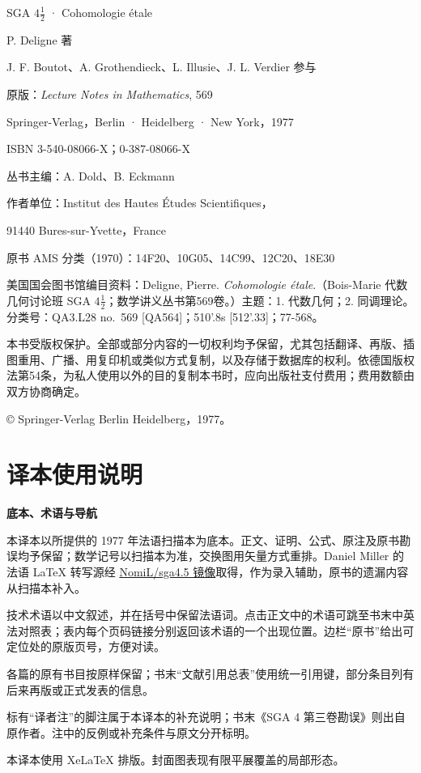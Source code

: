 {\large SGA $4\frac12$ · Cohomologie étale}\par
\vspace{10mm}
P. Deligne 著\par
J. F. Boutot、A. Grothendieck、L. Illusie、J. L. Verdier 参与\par
\vspace{10mm}
原版：\textit{Lecture Notes in Mathematics}, 569\par
Springer-Verlag，Berlin · Heidelberg · New York，1977\par
ISBN 3-540-08066-X；0-387-08066-X\par
丛书主编：A. Dold、B. Eckmann\par
作者单位：Institut des Hautes Études Scientifiques，\par
91440 Bures-sur-Yvette，France\par
原书 AMS 分类（1970）：14F20、10G05、14C99、12C20、18E30\par

\vspace{8mm}
{\footnotesize
美国国会图书馆编目资料：Deligne, Pierre. \textit{Cohomologie étale}.（Bois-Marie 代数几何讨论班 SGA $4\frac12$；数学讲义丛书第569卷。）主题：1. 代数几何；2. 同调理论。分类号：QA3.L28 no.~569 [QA564]；510'.8s [512'.33]；77-568。\par
\vspace{4mm}
本书受版权保护。全部或部分内容的一切权利均予保留，尤其包括翻译、再版、插图重用、广播、用复印机或类似方式复制，以及存储于数据库的权利。依德国版权法第54条，为私人使用以外的目的复制本书时，应向出版社支付费用；费用数额由双方协商确定。\par
© Springer-Verlag Berlin Heidelberg，1977。
}
\clearpage
\chapter*{译本使用说明}
{\bfseries\color{Ink}底本、术语与导航}\par
本译本以所提供的 1977 年法语扫描本为底本。正文、证明、公式、原注及原书勘误均予保留；数学记号以扫描本为准，交换图用矢量方式重排。Daniel Miller 的法语 \LaTeX{} 转写源经 \href{https://github.com/NomiL/sga4.5}{NomiL/sga4.5 镜像}取得，作为录入辅助，原书的遗漏内容从扫描本补入。\par
技术术语以中文叙述，并在括号中保留法语词。点击正文中的术语可跳至书末中英法对照表；表内每个页码链接分别返回该术语的一个出现位置。边栏“原书”给出可定位处的原版页号，方便对读。\par
各篇的原有书目按原样保留；书末“文献引用总表”使用统一引用键，部分条目列有后来再版或正式发表的信息。\par
标有“译者注”的脚注属于本译本的补充说明；书末《SGA 4 第三卷勘误》则出自原作者。注中的反例或补充条件与原文分开标明。\par
\vfill
{\footnotesize\color{Muted}本译本使用 XeLaTeX 排版。封面图表现有限平展覆盖的局部形态。}
\clearpage
